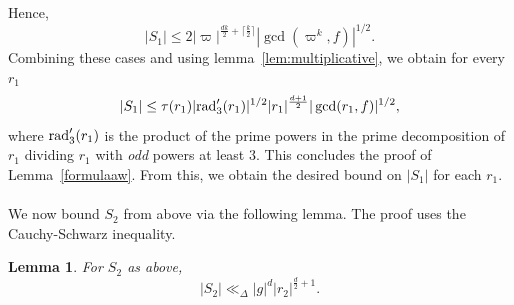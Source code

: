 \documentclass[11pt]{amsart}
\theoremstyle{plain}
\theoremstyle{plain}
\newtheorem{lemma}[theorem]{Lemma}
\theoremstyle{remark}
\theoremstyle{definition}
\newcommand{\rad}{\textup{rad}'_3}
\begin{document}
Hence,
\[|S_1|\leq 2|\varpi|^{\frac{dk}{2}+\lceil\frac{k}{2}\rceil}|\gcd(\varpi^k,f)|^{1/2}.\]
Combining these cases and using lemma~\ref{lem:multiplicative}, we obtain for every $r_1$
\[|S_1|\leq \tau(r_1)|\rad(r_1)|^{1/2}|r_1|^{\frac{d+1}{2}}|\gcd(r_1,f)|^{1/2},\]
where $\rad(r_1)$ is the product of the prime powers in the prime decomposition of $r_1$ dividing $r_1$ with \textit{odd} powers at least $3$. This concludes the proof of Lemma~\ref{formulaaw}.
From this, we obtain the desired bound on $|S_1|$ for each $r_1$.\\
\\
We now bound $S_2$ from above via the following lemma. The proof uses the Cauchy-Schwarz inequality. 
\begin{lemma}\label{lem:S2bound}For $S_2$ as above,
\[|S_2|\ll_{\Delta}|g|^d|r_2|^{\frac{d}{2}+1}.\]
\end{lemma}
\end{document}
